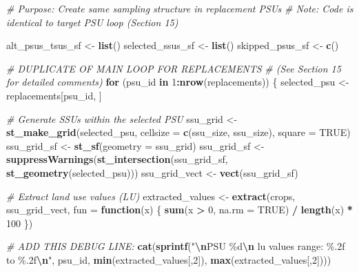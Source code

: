 \documentclass[
  10pt,
  b5paper,
  oneside]{book}
\newenvironment{Shaded}{\begin{snugshade}}{\end{snugshade}}
\newcommand{\AttributeTok}[1]{\textcolor[rgb]{0.13,0.29,0.53}{#1}}
\newcommand{\CommentTok}[1]{\textcolor[rgb]{0.56,0.35,0.01}{\textit{#1}}}
\newcommand{\ConstantTok}[1]{\textcolor[rgb]{0.56,0.35,0.01}{#1}}
\newcommand{\ControlFlowTok}[1]{\textcolor[rgb]{0.13,0.29,0.53}{\textbf{#1}}}
\newcommand{\DecValTok}[1]{\textcolor[rgb]{0.00,0.00,0.81}{#1}}
\newcommand{\FunctionTok}[1]{\textcolor[rgb]{0.13,0.29,0.53}{\textbf{#1}}}
\newcommand{\NormalTok}[1]{#1}
\newcommand{\OtherTok}[1]{\textcolor[rgb]{0.56,0.35,0.01}{#1}}
\newcommand{\SpecialCharTok}[1]{\textcolor[rgb]{0.81,0.36,0.00}{\textbf{#1}}}
\newcommand{\StringTok}[1]{\textcolor[rgb]{0.31,0.60,0.02}{#1}}
\begin{document}
\begin{Shaded}
\begin{Highlighting}[]
\CommentTok{\# Purpose: Create same sampling structure in replacement PSUs}
\CommentTok{\# Note: Code is identical to target PSU loop (Section 15)}

\NormalTok{alt\_psus\_tsus\_sf }\OtherTok{\textless{}{-}} \FunctionTok{list}\NormalTok{()}
\NormalTok{selected\_ssus\_sf }\OtherTok{\textless{}{-}} \FunctionTok{list}\NormalTok{()}
\NormalTok{skipped\_psus\_sf }\OtherTok{\textless{}{-}} \FunctionTok{c}\NormalTok{()}

\CommentTok{\# DUPLICATE OF MAIN LOOP FOR REPLACEMENTS}
\CommentTok{\# (See Section 15 for detailed comments)}
\ControlFlowTok{for}\NormalTok{ (psu\_id }\ControlFlowTok{in} \DecValTok{1}\SpecialCharTok{:}\FunctionTok{nrow}\NormalTok{(replacements)) \{}
\NormalTok{  selected\_psu }\OtherTok{\textless{}{-}}\NormalTok{ replacements[psu\_id, ]}
  
  \CommentTok{\# Generate SSUs within the selected PSU}
\NormalTok{  ssu\_grid }\OtherTok{\textless{}{-}} \FunctionTok{st\_make\_grid}\NormalTok{(selected\_psu, }\AttributeTok{cellsize =} \FunctionTok{c}\NormalTok{(ssu\_size, ssu\_size), }\AttributeTok{square =} \ConstantTok{TRUE}\NormalTok{)}
\NormalTok{  ssu\_grid\_sf }\OtherTok{\textless{}{-}} \FunctionTok{st\_sf}\NormalTok{(}\AttributeTok{geometry =}\NormalTok{ ssu\_grid)}
\NormalTok{  ssu\_grid\_sf }\OtherTok{\textless{}{-}} \FunctionTok{suppressWarnings}\NormalTok{(}\FunctionTok{st\_intersection}\NormalTok{(ssu\_grid\_sf, }\FunctionTok{st\_geometry}\NormalTok{(selected\_psu)))}
\NormalTok{  ssu\_grid\_vect }\OtherTok{\textless{}{-}} \FunctionTok{vect}\NormalTok{(ssu\_grid\_sf)}
  
  \CommentTok{\# Extract land use values (LU)}
\NormalTok{  extracted\_values }\OtherTok{\textless{}{-}} \FunctionTok{extract}\NormalTok{(crops, ssu\_grid\_vect, }\AttributeTok{fun =} \ControlFlowTok{function}\NormalTok{(x) \{}
    \FunctionTok{sum}\NormalTok{(x }\SpecialCharTok{\textgreater{}} \DecValTok{0}\NormalTok{, }\AttributeTok{na.rm =} \ConstantTok{TRUE}\NormalTok{) }\SpecialCharTok{/} \FunctionTok{length}\NormalTok{(x) }\SpecialCharTok{*} \DecValTok{100}
\NormalTok{  \})}
  
  \CommentTok{\# ADD THIS DEBUG LINE:}
  \FunctionTok{cat}\NormalTok{(}\FunctionTok{sprintf}\NormalTok{(}\StringTok{"}\SpecialCharTok{\textbackslash{}n}\StringTok{PSU \%d}\SpecialCharTok{\textbackslash{}n}\StringTok{ lu values range: \%.2f to \%.2f}\SpecialCharTok{\textbackslash{}n}\StringTok{"}\NormalTok{, }
\NormalTok{              psu\_id, }\FunctionTok{min}\NormalTok{(extracted\_values[,}\DecValTok{2}\NormalTok{]), }\FunctionTok{max}\NormalTok{(extracted\_values[,}\DecValTok{2}\NormalTok{])))}
  

\end{Highlighting}
\end{Shaded}
\end{document}

